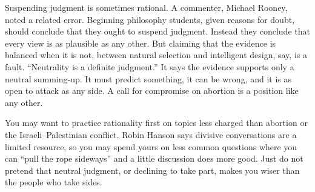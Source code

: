 Suspending judgment is sometimes rational. A commenter, Michael Rooney, noted a related error. Beginning philosophy students, given reasons for doubt, should conclude that they ought to suspend judgment. Instead they conclude that every view is as plausible as any other. But claiming that the evidence is balanced when it is not, between natural selection and intelligent design, say, is a fault. ``Neutrality is a definite judgment.'' It says the evidence supports only a neutral summing-up. It must predict something, it can be wrong, and it is as open to attack as any side. A call for compromise on abortion is a position like any other.

You may want to practice rationality first on topics less charged than abortion or the Israeli--Palestinian conflict.  Robin Hanson says divisive conversations are a limited resource, so you may spend yours on less common questions where you can ``pull the rope sideways'' and a little discussion does more good. Just do not pretend that neutral judgment, or declining to take part, makes you wiser than the people who take sides.
